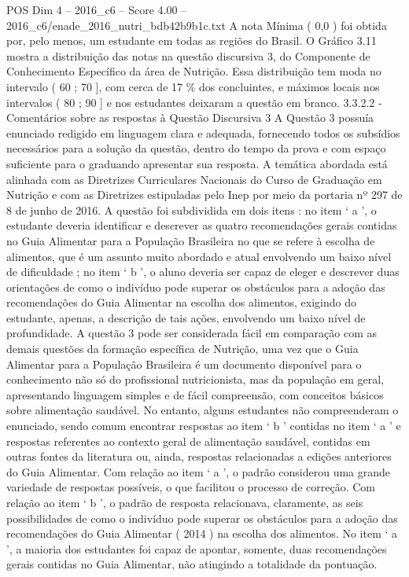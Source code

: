 \begin{textsample}{POS Dim 4 – 2016\_c6 – Score 4.00 – 2016\_c6/enade\_2016\_nutri\_bdb42b9b1c.txt}
A nota Mínima ( 0,0 ) foi obtida por, pelo menos, um estudante em todas as regiões do Brasil.
O Gráfico 3.11 mostra a distribuição das notas na questão discursiva 3, do Componente de Conhecimento Específico da área de Nutrição.
Essa distribuição tem moda no intervalo ( 60 ; 70 ], com cerca de 17 \% dos concluintes, e máximos locais nos intervalos ( 80 ; 90 ] e nos estudantes deixaram a questão em branco. 3.3.2.2 - Comentários sobre as respostas à Questão Discursiva 3 A Questão 3 possuía enunciado redigido em linguagem clara e adequada, fornecendo todos os subsídios necessários para a solução da questão, dentro do tempo da prova e com espaço suficiente para o graduando apresentar sua resposta.
A temática abordada está alinhada com as Diretrizes Curriculares Nacionais do Curso de Graduação em Nutrição e com as Diretrizes estipuladas pelo Inep por meio da portaria nº 297 de 8 de junho de 2016.
A questão foi subdividida em dois itens : no item ‘ a ’, o estudante deveria identificar e descrever as quatro recomendações gerais contidas no Guia Alimentar para a População Brasileira no que se refere à escolha de alimentos, que é um assunto muito abordado e atual envolvendo um baixo nível de dificuldade ; no item ‘ b ’, o aluno deveria ser capaz de eleger e descrever duas orientações de como o indivíduo pode superar os obstáculos para a adoção das recomendações do Guia Alimentar na escolha dos alimentos, exigindo do estudante, apenas, a descrição de tais ações, envolvendo um baixo nível de profundidade.
A questão 3 pode ser considerada fácil em comparação com as demais questões da formação específica de Nutrição, uma vez que o Guia Alimentar para a População Brasileira é um documento disponível para o conhecimento não só do profissional nutricionista, mas da população em geral, apresentando linguagem simples e de fácil compreensão, com conceitos básicos sobre alimentação saudável.
No entanto, alguns estudantes não compreenderam o enunciado, sendo comum encontrar respostas ao item ‘ b ’ contidas no item ‘ a ’ e respostas referentes ao contexto geral de alimentação saudável, contidas em outras fontes da literatura ou, ainda, respostas relacionadas a edições anteriores do Guia Alimentar.
Com relação ao item ‘ a ’, o padrão considerou uma grande variedade de respostas possíveis, o que facilitou o processo de correção.
Com relação ao item ‘ b ’, o padrão de resposta relacionava, claramente, as seis possibilidades de como o indivíduo pode superar os obstáculos para a adoção das recomendações do Guia Alimentar ( 2014 ) na escolha dos alimentos.
No item ‘ a ’, a maioria dos estudantes foi capaz de apontar, somente, duas recomendações gerais contidas no Guia Alimentar, não atingindo a totalidade da pontuação.

\end{textsample}
